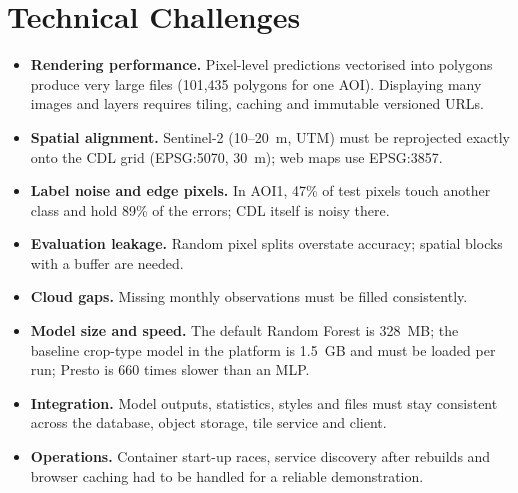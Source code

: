 \section{Technical Challenges}
\begin{itemize}
  \item \textbf{Rendering performance.} Pixel-level predictions vectorised into polygons produce very
        large files (101,435 polygons for one AOI). Displaying many images and layers requires
        tiling, caching and immutable versioned URLs.
  \item \textbf{Spatial alignment.} Sentinel-2 (10--20~m, UTM) must be reprojected exactly onto the
        CDL grid (EPSG:5070, 30~m); web maps use EPSG:3857.
  \item \textbf{Label noise and edge pixels.} In AOI1, 47\% of test pixels touch another class and
        hold 89\% of the errors; CDL itself is noisy there.
  \item \textbf{Evaluation leakage.} Random pixel splits overstate accuracy; spatial blocks with a
        buffer are needed.
  \item \textbf{Cloud gaps.} Missing monthly observations must be filled consistently.
  \item \textbf{Model size and speed.} The default Random Forest is 328~MB; the baseline crop-type
        model in the platform is 1.5~GB and must be loaded per run; Presto is 660 times slower than
        an MLP.
  \item \textbf{Integration.} Model outputs, statistics, styles and files must stay consistent across
        the database, object storage, tile service and client.
  \item \textbf{Operations.} Container start-up races, service discovery after rebuilds and browser
        caching had to be handled for a reliable demonstration.
\end{itemize}

